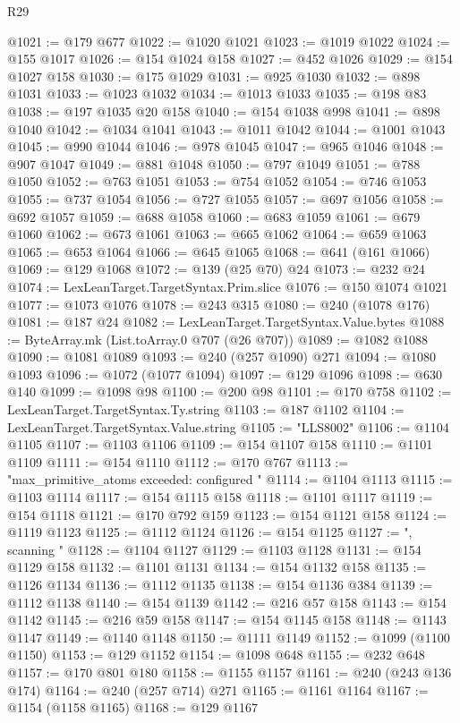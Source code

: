 \begin{lexlean}{R29}
\begin{coremodule}
@1021 := @179 @677
@1022 := @1020 @1021
@1023 := @1019 @1022
@1024 := @155 @1017
@1026 := @154 @1024 @158
@1027 := @452 @1026
@1029 := @154 @1027 @158
@1030 := @175 @1029
@1031 := @925 @1030
@1032 := @898 @1031
@1033 := @1023 @1032
@1034 := @1013 @1033
@1035 := @198 @83
@1038 := @197 @1035 @20 @158
@1040 := @154 @1038 @998
@1041 := @898 @1040
@1042 := @1034 @1041
@1043 := @1011 @1042
@1044 := @1001 @1043
@1045 := @990 @1044
@1046 := @978 @1045
@1047 := @965 @1046
@1048 := @907 @1047
@1049 := @881 @1048
@1050 := @797 @1049
@1051 := @788 @1050
@1052 := @763 @1051
@1053 := @754 @1052
@1054 := @746 @1053
@1055 := @737 @1054
@1056 := @727 @1055
@1057 := @697 @1056
@1058 := @692 @1057
@1059 := @688 @1058
@1060 := @683 @1059
@1061 := @679 @1060
@1062 := @673 @1061
@1063 := @665 @1062
@1064 := @659 @1063
@1065 := @653 @1064
@1066 := @645 @1065
@1068 := @641 (@161 @1066)
@1069 := @129 @1068
@1072 := @139 (@25 @70) @24
@1073 := @232 @24
@1074 := LexLeanTarget.TargetSyntax.Prim.slice
@1076 := @150 @1074 @1021
@1077 := @1073 @1076
@1078 := @243 @315
@1080 := @240 (@1078 @176)
@1081 := @187 @24
@1082 := LexLeanTarget.TargetSyntax.Value.bytes
@1088 := ByteArray.mk (List.toArray.{0} @707 (@26 @707))
@1089 := @1082 @1088
@1090 := @1081 @1089
@1093 := @240 (@257 @1090) @271
@1094 := @1080 @1093
@1096 := @1072 (@1077 @1094)
@1097 := @129 @1096
@1098 := @630 @140
@1099 := @1098 @98
@1100 := @200 @98
@1101 := @170 @758
@1102 := LexLeanTarget.TargetSyntax.Ty.string
@1103 := @187 @1102
@1104 := LexLeanTarget.TargetSyntax.Value.string
@1105 := "LLS8002"
@1106 := @1104 @1105
@1107 := @1103 @1106
@1109 := @154 @1107 @158
@1110 := @1101 @1109
@1111 := @154 @1110
@1112 := @170 @767
@1113 := "max_primitive_atoms exceeded: configured "
@1114 := @1104 @1113
@1115 := @1103 @1114
@1117 := @154 @1115 @158
@1118 := @1101 @1117
@1119 := @154 @1118
@1121 := @170 @792 @159
@1123 := @154 @1121 @158
@1124 := @1119 @1123
@1125 := @1112 @1124
@1126 := @154 @1125
@1127 := ", scanning "
@1128 := @1104 @1127
@1129 := @1103 @1128
@1131 := @154 @1129 @158
@1132 := @1101 @1131
@1134 := @154 @1132 @158
@1135 := @1126 @1134
@1136 := @1112 @1135
@1138 := @154 @1136 @384
@1139 := @1112 @1138
@1140 := @154 @1139
@1142 := @216 @57 @158
@1143 := @154 @1142
@1145 := @216 @59 @158
@1147 := @154 @1145 @158
@1148 := @1143 @1147
@1149 := @1140 @1148
@1150 := @1111 @1149
@1152 := @1099 (@1100 @1150)
@1153 := @129 @1152
@1154 := @1098 @648
@1155 := @232 @648
@1157 := @170 @801 @180
@1158 := @1155 @1157
@1161 := @240 (@243 @136 @174)
@1164 := @240 (@257 @714) @271
@1165 := @1161 @1164
@1167 := @1154 (@1158 @1165)
@1168 := @129 @1167

\end{coremodule}
\end{lexlean}
